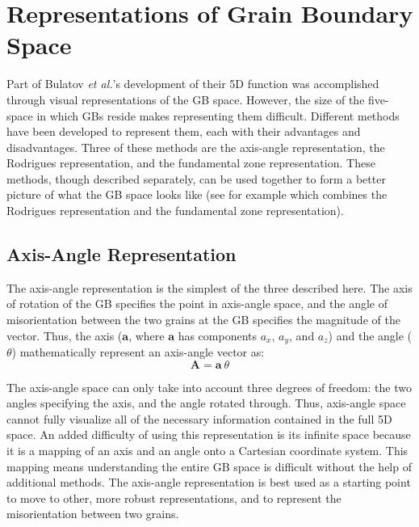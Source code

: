 \documentclass[12pt]{report}
\begin{document}
\section{Representations of Grain Boundary Space\label{methods:GBReps}}
Part of Bulatov \emph{et al.}'s development of their 5D function was accomplished through visual representations of the GB space.  However, the size of the five-space in which GBs reside makes representing them difficult.  Different methods have been developed to represent them, each with their advantages and disadvantages.  Three of these methods are the axis-angle representation, the Rodrigues representation, and the fundamental zone representation.  These methods, though described separately, can be used together to form a better picture of what the GB space looks like (see for example  which combines the Rodrigues representation and the fundamental zone representation).

\subsection{Axis-Angle Representation\label{GBReps:AA}}
The axis-angle representation is the simplest of the three described here.  The axis of rotation of the GB specifies the point in axis-angle space, and the angle of misorientation between the two grains at the GB specifies the magnitude of the vector.  Thus, the axis ($\bm{a}$, where $\bm{a}$ has components $a_x$, $a_y$, and $a_z$) and the angle ($\theta$) mathematically represent an axis-angle vector as:
\begin{equation}
\bm{A} = \bm{a}\ \theta
\label{eq:aaVec}
\end{equation} 

The axis-angle space can only take into account three degrees of freedom: the two angles specifying the axis, and the angle rotated through.  Thus, axis-angle space cannot fully visualize all of the necessary information contained in the full 5D space.\cite{frank1988} An added difficulty of using this representation is its infinite space because it is a mapping of an axis and an angle onto a Cartesian coordinate system.  This mapping means understanding the entire GB space is difficult without the help of additional methods.  The axis-angle representation is best used as a starting point to move to other, more robust representations, and to represent the misorientation between two grains.\cite{randle2000}
\end{document}
